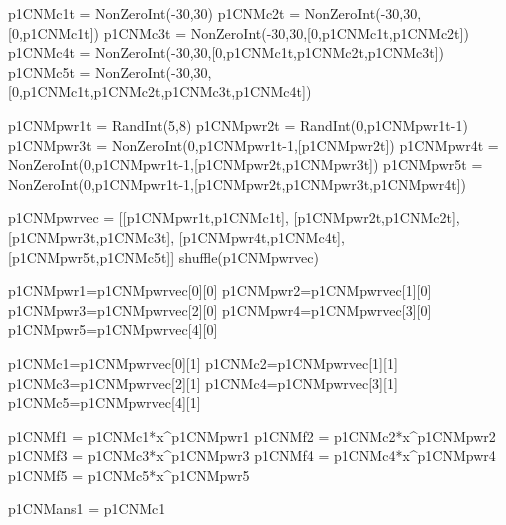 \documentclass{ximera}
\begin{document}
\begin{sagesilent}
p1CNMc1t = NonZeroInt(-30,30)
p1CNMc2t = NonZeroInt(-30,30,[0,p1CNMc1t])
p1CNMc3t = NonZeroInt(-30,30,[0,p1CNMc1t,p1CNMc2t])
p1CNMc4t = NonZeroInt(-30,30,[0,p1CNMc1t,p1CNMc2t,p1CNMc3t])
p1CNMc5t = NonZeroInt(-30,30,[0,p1CNMc1t,p1CNMc2t,p1CNMc3t,p1CNMc4t])

p1CNMpwr1t = RandInt(5,8)
p1CNMpwr2t = RandInt(0,p1CNMpwr1t-1)
p1CNMpwr3t = NonZeroInt(0,p1CNMpwr1t-1,[p1CNMpwr2t])
p1CNMpwr4t = NonZeroInt(0,p1CNMpwr1t-1,[p1CNMpwr2t,p1CNMpwr3t])
p1CNMpwr5t = NonZeroInt(0,p1CNMpwr1t-1,[p1CNMpwr2t,p1CNMpwr3t,p1CNMpwr4t])

p1CNMpwrvec = [[p1CNMpwr1t,p1CNMc1t], [p1CNMpwr2t,p1CNMc2t], [p1CNMpwr3t,p1CNMc3t], [p1CNMpwr4t,p1CNMc4t], [p1CNMpwr5t,p1CNMc5t]]
shuffle(p1CNMpwrvec)

p1CNMpwr1=p1CNMpwrvec[0][0]
p1CNMpwr2=p1CNMpwrvec[1][0]
p1CNMpwr3=p1CNMpwrvec[2][0]
p1CNMpwr4=p1CNMpwrvec[3][0]
p1CNMpwr5=p1CNMpwrvec[4][0]

p1CNMc1=p1CNMpwrvec[0][1]
p1CNMc2=p1CNMpwrvec[1][1]
p1CNMc3=p1CNMpwrvec[2][1]
p1CNMc4=p1CNMpwrvec[3][1]
p1CNMc5=p1CNMpwrvec[4][1]




p1CNMf1 = p1CNMc1*x^p1CNMpwr1
p1CNMf2 = p1CNMc2*x^p1CNMpwr2
p1CNMf3 = p1CNMc3*x^p1CNMpwr3
p1CNMf4 = p1CNMc4*x^p1CNMpwr4
p1CNMf5 = p1CNMc5*x^p1CNMpwr5

p1CNMans1 =  p1CNMc1

\end{sagesilent}
\end{document}
